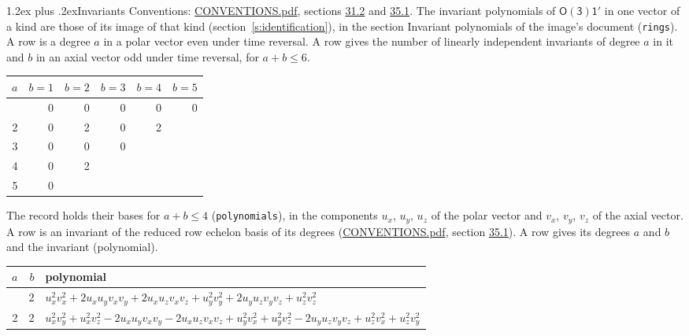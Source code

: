 \documentclass[10pt,a4paper]{article}
\makeatletter
\renewcommand\section{\@startsection{section}{1}{\z@}{-3ex plus -1ex minus -.2ex}%
  {1.2ex plus .2ex}{\normalfont\large\sffamily\bfseries\color{parttitle}}}
\numberwithin{equation}{section}
\newcommand{\grp}[1]{\mathsf{#1}}
\makeatother
\begin{document}
\section{Invariants}\label{s:invariants}
Conventions: \href{../../CONVENTIONS.pdf}{CONVENTIONS.pdf}, sections \href{../../CONVENTIONS.pdf\#conv.31.2}{31.2} and \href{../../CONVENTIONS.pdf\#conv.35.1}{35.1}.
The invariant polynomials of $\grp{O(3)1'}$ in one vector of a kind are those of its image of that kind (section~\ref{s:identification}), in the section Invariant polynomials of the image's document (\texttt{rings}).
\leavevmode\label{n:index.degree.polar}\label{n:index.degree.axial}A row is a degree $a$ in a polar vector even under time reversal. A row gives the number of linearly independent invariants of degree $a$ in it and $b$ in an axial vector odd under time reversal, for $a + b \le 6$.
{\small\begin{longtable}{@{}rrrrrr@{}}\toprule
$a$ & $b = 1$ & $b = 2$ & $b = 3$ & $b = 4$ & $b = 5$\\\midrule\endhead
\bottomrule\endfoot\endlastfoot
1 & 0 & 0 & 0 & 0 & 0\\*
2 & 0 & 2 & 0 & 2 & \\*
3 & 0 & 0 & 0 &  & \\*
4 & 0 & 2 &  &  & \\*
5 & 0 &  &  &  & \\
\bottomrule\end{longtable}}
\leavevmode\label{n:local.component.polar}\label{n:local.component.axial}The record holds their bases for $a + b \le 4$ (\texttt{polynomials}), in the components $u_{x}$, $u_{y}$, $u_{z}$ of the polar vector and $v_{x}$, $v_{y}$, $v_{z}$ of the axial vector. \label{n:head.polynomial}A row is an invariant of the reduced row echelon basis of its degrees (\href{../../CONVENTIONS.pdf}{CONVENTIONS.pdf}, section \href{../../CONVENTIONS.pdf\#conv.35.1}{35.1}). A row gives its degrees $a$ and $b$ and the invariant (polynomial).
{\small\renewcommand{\arraystretch}{1.2}\begin{longtable}{@{}rrl@{}}\toprule
$a$ & $b$ & polynomial\\\midrule\endhead
\bottomrule\endfoot\endlastfoot
2 & 2 & $u_{x}^{2}v_{x}^{2} + 2u_{x}u_{y}v_{x}v_{y} + 2u_{x}u_{z}v_{x}v_{z} + u_{y}^{2}v_{y}^{2} + 2u_{y}u_{z}v_{y}v_{z} + u_{z}^{2}v_{z}^{2}$\\*
2 & 2 & $u_{x}^{2}v_{y}^{2} + u_{x}^{2}v_{z}^{2} - 2u_{x}u_{y}v_{x}v_{y} - 2u_{x}u_{z}v_{x}v_{z} + u_{y}^{2}v_{x}^{2} + u_{y}^{2}v_{z}^{2} - 2u_{y}u_{z}v_{y}v_{z} + u_{z}^{2}v_{x}^{2} + u_{z}^{2}v_{y}^{2}$\\
\bottomrule\end{longtable}}
\end{document}
